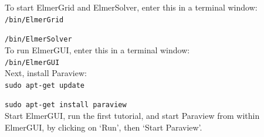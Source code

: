 To start ElmerGrid and ElmerSolver, enter this in a terminal window:\\

\texttt{/bin/ElmerGrid}

\texttt{/bin/ElmerSolver}\\

To run ElmerGUI, enter this in a terminal window:\\

\texttt{/bin/ElmerGUI}\\

Next, install Paraview:\\

\texttt{sudo apt-get update}

\texttt{sudo apt-get install paraview}\\

Start ElmerGUI, run the first tutorial, and start Paraview from within ElmerGUI, by clicking on `Run', then `Start Paraview'.










